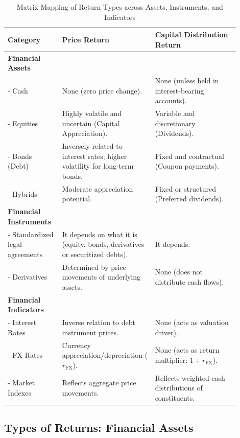\begin{table}[!htbp]
\centering
\caption{Matrix Mapping of Return Types across Assets, Instruments, and Indicators}
\label{tab:return_matrix_m2}
\begin{tabular}{p{0.22\linewidth} | p{0.34\linewidth} | p{0.34\linewidth}}
\toprule
\textbf{Category} & \textbf{Price Return} & \textbf{Capital Distribution Return} \\
\midrule
\textbf{Financial Assets} & & \\
- Cash & None (zero price change). & None (unless held in interest-bearing accounts). \\
- Equities & Highly volatile and uncertain (Capital Appreciation). & Variable and discretionary (Dividends). \\
- Bonds (Debt) & Inversely related to interest rates; higher volatility for long-term bonds. & Fixed and contractual (Coupon payments). \\
- Hybrids & Moderate appreciation potential. & Fixed or structured (Preferred dividends). \\
\midrule
\textbf{Financial Instruments} & & \\
- Standardized legal agreements & It depends on what it is (equity, bonds, derivatives or securitized debts). & It depends. \\
- Derivatives & Determined by price movements of underlying assets. & None (does not distribute cash flows). \\
\midrule
\textbf{Financial Indicators} & & \\
- Interest Rates & Inverse relation to debt instrument prices. & None (acts as valuation driver). \\
- FX Rates & Currency appreciation/depreciation ($r_{\text{FX}}$). & None (acts as return multiplier: $1 + r_{\text{FX}}$). \\
- Market Indexes & Reflects aggregate price movements. & Reflects weighted cash distributions of constituents. \\
\bottomrule
\end{tabular}
\end{table}

\subsection{Types of Returns: Financial Assets}
	\label{subsec:Types of Returns: Financial Assets}

